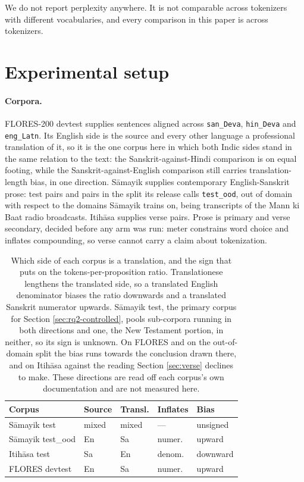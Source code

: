 \documentclass[11pt]{article}
\begin{document}
We do not report perplexity anywhere. It is not comparable across tokenizers with
different vocabularies, and every comparison in this paper is across tokenizers.

\section{Experimental setup}
\label{sec:setup}

\paragraph{Corpora.} FLORES-200 devtest \citep{nllb-2022-flores} supplies
\numFloresSents{} sentences aligned across \texttt{san\_Deva}, \texttt{hin\_Deva} and
\texttt{eng\_Latn}. Its English side is the source and every other language a professional
translation of it, so it is the one corpus here in which both Indic sides stand in the same
relation to the text: the Sanskrit-against-Hindi comparison is on equal footing, while the
Sanskrit-against-English comparison still carries translation-length bias, in one
direction. S\=amayik
\citep{maheshwari-etal-2024-samayik} supplies contemporary English-Sanskrit prose:
\numSamayikTest{} test pairs and \numSamayikOod{} pairs in the split its release calls
\texttt{test\_ood}, out of domain with respect to the domains S\=amayik trains on, being
transcripts of the Mann ki Baat radio broadcasts. Itih\=asa
\citep{aralikatte-etal-2021-itihasa} supplies \numItihasaTest{} verse pairs. Prose is
primary and verse secondary, decided before any arm was run: meter constrains word choice
and inflates compounding, so verse cannot carry a claim about tokenization.

\begin{table}[t]
\centering
\footnotesize
\setlength{\tabcolsep}{3.2pt}
\begin{tabular}{lllll}
\toprule
Corpus & Source & Transl. & Inflates & Bias \\
\midrule
S\=amayik test & mixed & mixed & --- & unsigned \\
S\=amayik test\_ood & En & Sa & numer. & upward \\
Itih\=asa test & Sa & En & denom. & downward \\
FLORES devtest & En & Sa & numer. & upward \\
\bottomrule
\end{tabular}
\caption{Which side of each corpus is a translation, and the sign that puts on the
  tokens-per-proposition ratio. Translationese lengthens the translated side, so a
  translated English denominator biases the ratio downwards and a translated Sanskrit
  numerator upwards. S\=amayik test, the primary corpus for
  Section \ref{sec:rq2-controlled}, pools sub-corpora running in both directions and one,
  the New Testament portion, in neither, so its sign is unknown. On FLORES and on the
  out-of-domain split the bias runs towards the conclusion drawn there, and on Itih\=asa
  against the reading Section \ref{sec:verse} declines to make. These directions are read
  off each corpus's own documentation and are not measured here.}
\label{tab:direction}
\end{table}
\end{document}
